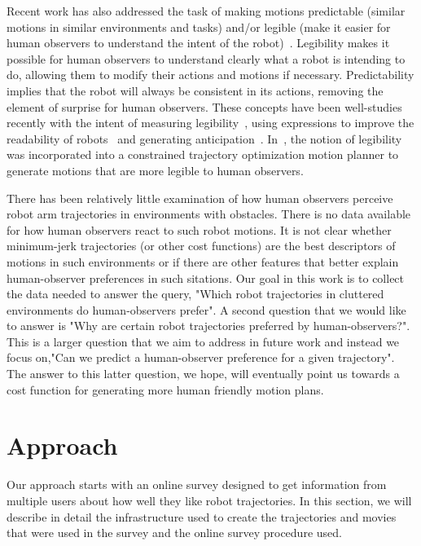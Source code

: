 \documentclass[letterpaper, 10 pt, conference]{ieeeconf}  %
\begin{document}
Recent work has also addressed the task of making motions predictable (similar motions in similar environments and tasks) and/or legible (make it easier for human observers to understand the intent of the robot)~\cite{Beetz:2010}. Legibility makes it possible for human observers to understand clearly what a robot is intending to do, allowing them to modify their actions and motions if necessary. Predictability implies that the robot will always be consistent in its actions, removing the element of surprise for human observers. These concepts have been well-studies recently with the intent of measuring legibility~\cite{Lichtenthaler:2011}, using expressions to improve the readability of robots~\cite{Takayama:2011} and generating anticipation~\cite{Gielniak:2011}. In~\cite{Dragan:2013}, the notion of legibility was incorporated into a constrained trajectory optimization motion planner to generate motions that are more legible to human observers. 

There has been relatively little examination of how human observers perceive robot arm trajectories in environments with obstacles. There is no data available for how human observers react to such robot motions. It is not clear whether minimum-jerk trajectories (or other cost functions) are the best descriptors of motions in such environments or if there are other features that better explain human-observer preferences in such sitations. Our goal in this work is to collect the data needed to answer the query, "Which robot trajectories in cluttered environments do human-observers prefer". A second question that we would like to answer is "Why are certain robot trajectories preferred by human-observers?". This is a larger question that we aim to address in future work and instead we focus on,"Can we predict a human-observer preference for a given trajectory". The answer to this latter question, we hope, will eventually point us towards a cost function for generating more human friendly motion plans. 

\section{Approach}
\label{sec:survey}
Our approach starts with an online survey designed to get information from multiple users about how well they like robot trajectories. In this section, we will describe in detail the infrastructure used to create the trajectories and movies that were used in the survey and the online 
survey procedure used. 
\end{document}
